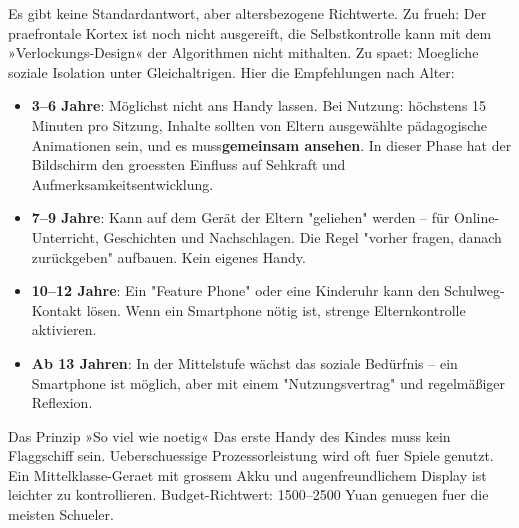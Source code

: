 


Es gibt keine Standardantwort, aber altersbezogene Richtwerte. Zu frueh: Der praefrontale Kortex ist noch nicht ausgereift, die Selbstkontrolle kann mit dem »Verlockungs-Design« der Algorithmen nicht mithalten. Zu spaet: Moegliche soziale Isolation unter Gleichaltrigen. Hier die Empfehlungen nach Alter:

\begin{itemize}
  \item \textbf{3–6 Jahre}: Möglichst nicht ans Handy lassen. Bei Nutzung: höchstens 15 Minuten pro Sitzung, Inhalte sollten von Eltern ausgewählte pädagogische Animationen sein, und es muss\textbf{gemeinsam ansehen}. In dieser Phase hat der Bildschirm den groessten Einfluss auf Sehkraft und Aufmerksamkeitsentwicklung.
  \item \textbf{7–9 Jahre}: Kann auf dem Gerät der Eltern "geliehen" werden – für Online-Unterricht, Geschichten und Nachschlagen. Die Regel "vorher fragen, danach zurückgeben" aufbauen. Kein eigenes Handy.
  \item \textbf{10–12 Jahre}: Ein "Feature Phone" oder eine Kinderuhr kann den Schulweg-Kontakt lösen. Wenn ein Smartphone nötig ist, strenge Elternkontrolle aktivieren.
  \item \textbf{Ab 13 Jahren}: In der Mittelstufe wächst das soziale Bedürfnis – ein Smartphone ist möglich, aber mit einem "Nutzungsvertrag" und regelmäßiger Reflexion.
\end{itemize}

\begin{tcbinfo}{Das Prinzip »So viel wie noetig«}
Das erste Handy des Kindes muss kein Flaggschiff sein. Ueberschuessige Prozessorleistung wird oft fuer Spiele genutzt. Ein Mittelklasse-Geraet mit grossem Akku und augenfreundlichem Display ist leichter zu kontrollieren. Budget-Richtwert: 1500–2500 Yuan genuegen fuer die meisten Schueler.

\end{tcbinfo}


